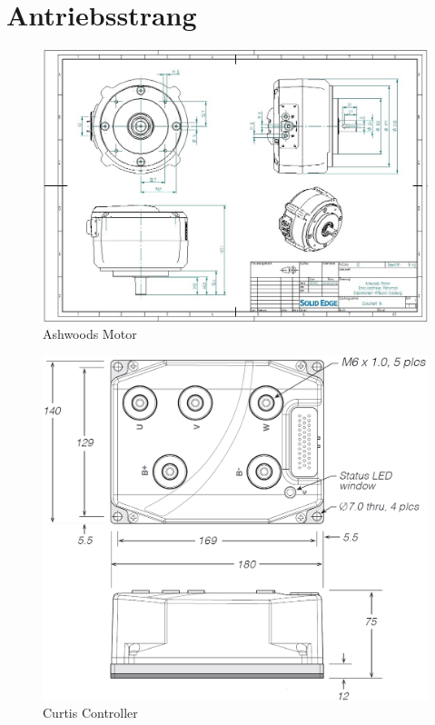 \section{Antriebsstrang}
\begin{figure} [H]
	\begin{center}
		\includegraphics[angle=90, width=\textwidth]{figures/antrieb/Ashwoods_CAD.jpg}
		\caption{Ashwoods Motor}
		\label{Ashwoods_CAD}
	\end{center}
\end{figure}

\begin{figure} [H]
	\begin{center}
		\includegraphics[width=1.05\textwidth]{figures/antrieb/Curtis_CAD.png}
		\caption{Curtis Controller}
		\label{Curtis_CAD}
	\end{center}
\end{figure}

